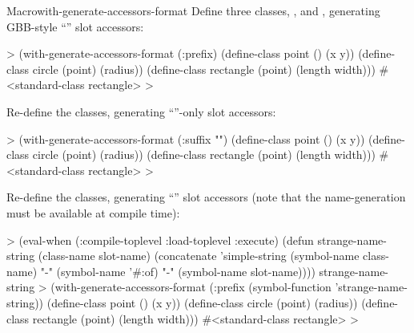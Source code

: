 \documentclass[10pt,twoside,english,pdftex]{article}
\begin{document}
\begin{functiondoc}{Macro}{with-generate-accessors-format}
\fnexamples
Define three classes, ,  and
, generating GBB-style
``'' slot accessors:
%
\W\supp
\begin{example}
  > (with-generate-accessors-format (:prefix)
      (define-class point ()
        (x y))
      (define-class circle (point)
        (radius))
      (define-class rectangle (point)
        (length width)))
  #<standard-class rectangle>
  >
\end{example}
%
Re-define the classes, generating ``''-only slot accessors:
%
\W\supp\notpretop
\begin{example}
  > (with-generate-accessors-format (:suffix "")
      (define-class point ()
        (x y))
      (define-class circle (point)
        (radius))
      (define-class rectangle (point)
        (length width)))
  #<standard-class rectangle>
  >
\end{example}
%
Re-define the classes, generating
``'' slot accessors (note that the
 name-generation  must be available
at compile time):
%
\W\supp\notpretop
\begin{example}
  > (eval-when (:compile-toplevel :load-toplevel :execute)
      (defun strange-name-string (class-name slot-name)
        (concatenate 'simple-string
          (symbol-name class-name) "-" 
          (symbol-name '#:of) "-" 
          (symbol-name slot-name))))
  strange-name-string
  > (with-generate-accessors-format (:prefix (symbol-function 'strange-name-string))
      (define-class point ()
        (x y))
      (define-class circle (point)
        (radius))
      (define-class rectangle (point)
        (length width)))
  #<standard-class rectangle>
  >
\end{example}

\end{functiondoc}

\end{document}
